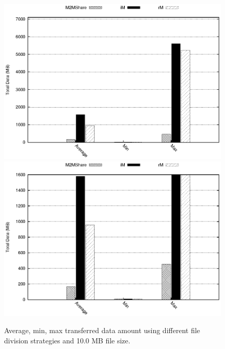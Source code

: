 \begin{figure}[htbp]
\centering%
\subfigure%
{\includegraphics[scale=0.8]{grafici/dataDFS_10MB.eps}}\qquad\qquad
\subfigure%
{\includegraphics{grafici/dataDFS_10MB_zoom.eps}}
\caption{Average, min, max transferred data amount using different file division strategies and 10.0 MB file size.\label{graficoDataFDS_10MB}}
\end{figure}

